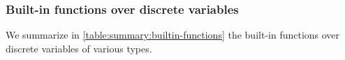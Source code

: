 %
%




\subsubsection{Built-in functions over discrete variables}\label{section:builtin-functions}

We summarize in \cref{table:summary:builtin-functions} the built-in functions over discrete variables of various types.

